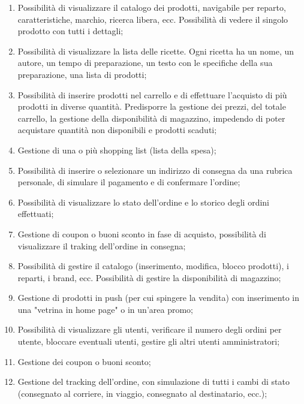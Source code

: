 \begin{enumerate}
		
	\item
		\label{f-up}
		Possibilità di visualizzare il catalogo dei prodotti, navigabile per reparto, caratteristiche, marchio, ricerca libera, ecc.
		Possibilità di vedere il singolo prodotto con tutti i dettagli;
	
	\item
		\label{ef-up}
		Possibilità di visualizzare la lista delle ricette. Ogni ricetta ha un nome, un autore, un tempo di preparazione, un testo con le specifiche della sua preparazione, una lista di prodotti;
	
	\item
		Possibilità di inserire prodotti nel carrello e di effettuare l'acquisto di più prodotti in diverse quantità.
		Predisporre la gestione dei prezzi, del totale carrello, la gestione della disponibilità di magazzino, impedendo di poter acquistare quantità non disponibili e prodotti scaduti;
		
	\item
		Gestione di una o più shopping list (lista della spesa);
		
	\item
		Possibilità di inserire o selezionare un indirizzo di consegna da una rubrica personale, di simulare il pagamento e di confermare l'ordine;
		
	\item
		Possibilità di visualizzare lo stato dell'ordine e lo storico degli ordini effettuati;
		
	\item
		\label{ef-ur}
		Gestione di coupon o buoni sconto in fase di acquisto, possibilità di visualizzare il traking dell'ordine in consegna;
		
	\item
		\label{sf-ua}
		Possibilità di gestire il catalogo (inserimento, modifica, blocco prodotti), i reparti, i brand, ecc.
		Possibilità di gestire la disponibilità di magazzino;
	
	\item
		Gestione di prodotti in push (per cui spingere la vendita) con inserimento in una "vetrina in home page" o in un'area promo;
	
	\item
		Possibilità di visualizzare gli utenti, verificare il numero degli ordini per utente, bloccare eventuali utenti, gestire gli altri utenti amministratori;
	
	\item
		Gestione dei coupon o buoni sconto;
	
	\item
		\label{ef-ua}
		Gestione del tracking dell'ordine, con simulazione di tutti i cambi di stato (consegnato al corriere, in viaggio, consegnato al destinatario, ecc.);
		
\end{enumerate}

